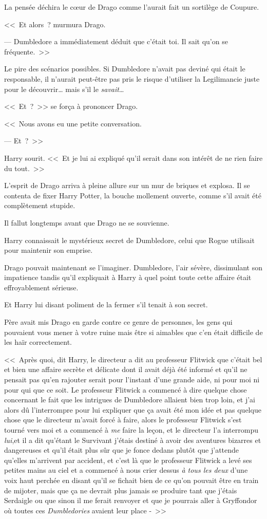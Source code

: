 La pensée déchira le cœur de Drago comme l'aurait fait un sortilège de Coupure.

<<~Et alors~? murmura Drago.

--- Dumbledore a immédiatement déduit que c'était toi. Il sait qu'on se fréquente.~>>

Le pire des scénarios possibles. Si Dumbledore n'avait pas deviné qui était le responsable, il n'aurait peut-être pas pris le risque d'utiliser la Legilimancie juste pour le découvrir… mais s'il le \emph{savait}…

<<~Et~?~>> se força à prononcer Drago.

<<~Nous avons eu une petite conversation.

--- Et~?~>>

Harry sourit. <<~Et je lui ai expliqué qu'il serait dans son intérêt de ne rien faire du tout.~>>

L'esprit de Drago arriva à pleine allure sur un mur de briques et explosa. Il se contenta de fixer Harry Potter, la bouche mollement ouverte, comme s'il avait été complètement stupide.

Il fallut longtemps avant que Drago ne se souvienne.

Harry connaissait le mystérieux secret de Dumbledore, celui que Rogue utilisait pour maintenir son emprise.

Drago pouvait maintenant se l'imaginer. Dumbledore, l'air sévère, dissimulant son impatience tandis qu'il expliquait à Harry à quel point toute cette affaire était effroyablement sérieuse.

Et Harry lui disant poliment de la fermer s'il tenait à son secret.

Père avait mis Drago en garde contre ce genre de personnes, les gens qui pouvaient vous mener à votre ruine mais être si aimables que c'en était difficile de les haïr correctement.

<<~Après quoi, dit Harry, le directeur a dit au professeur Flitwick que c'était bel et bien une affaire secrète et délicate dont il avait déjà été informé et qu'il ne pensait pas qu'en rajouter serait pour l'instant d'une grande aide, ni pour moi ni pour qui que ce soit. Le professeur Flitwick a commencé à dire quelque chose concernant le fait que les intrigues de Dumbledore allaient bien trop loin, et j'ai alors dû l'interrompre pour lui expliquer que ça avait été mon idée et pas quelque chose que le directeur m'avait forcé à faire, alors le professeur Flitwick s'est tourné vers moi et a commencé à \emph{me} faire la leçon, et le directeur l'a interrompu \emph{lui},et il a dit qu'étant le Survivant j'étais destiné à avoir des aventures bizarres et dangereuses et qu'il était plus sûr que je fonce dedans plutôt que j'attende qu'elles m'arrivent par accident, et c'est là que le professeur Flitwick a levé ses petites mains au ciel et a commencé à nous crier dessus \emph{à tous les deux} d'une voix haut perchée en disant qu'il se fichait bien de ce qu'on pouvait être en train de mijoter, mais que ça ne devrait plus jamais se produire tant que j'étais Serdaigle ou que sinon il me ferait renvoyer et que je pourrais aller à Gryffondor où toutes ces \emph{Dumbledories} avaient leur place -~>>

